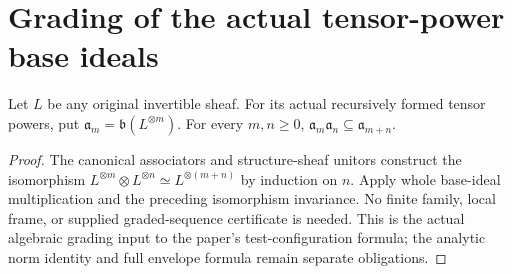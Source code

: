 \section{Grading of the actual tensor-power base ideals}

\begin{proposition}
\label{prop:actual-line-power-base-ideal-grading}
Let $L$ be any original invertible sheaf. For its actual recursively
formed tensor powers, put $\mathfrak a_m=\mathfrak b(L^{\otimes m})$.
For every $m,n\geq0$, $\mathfrak a_m\mathfrak a_n\subseteq
\mathfrak a_{m+n}$.
\leanok
\end{proposition}
\begin{proof}
The canonical associators and structure-sheaf unitors construct the
isomorphism $L^{\otimes m}\otimes L^{\otimes n}\simeq
L^{\otimes(m+n)}$ by induction on $n$. Apply whole base-ideal
multiplication and the preceding isomorphism invariance. No finite family,
local frame, or supplied graded-sequence certificate is needed. This is
the actual algebraic grading input to the paper's test-configuration
formula; the analytic norm identity and full envelope formula remain
separate obligations.
\end{proof}
